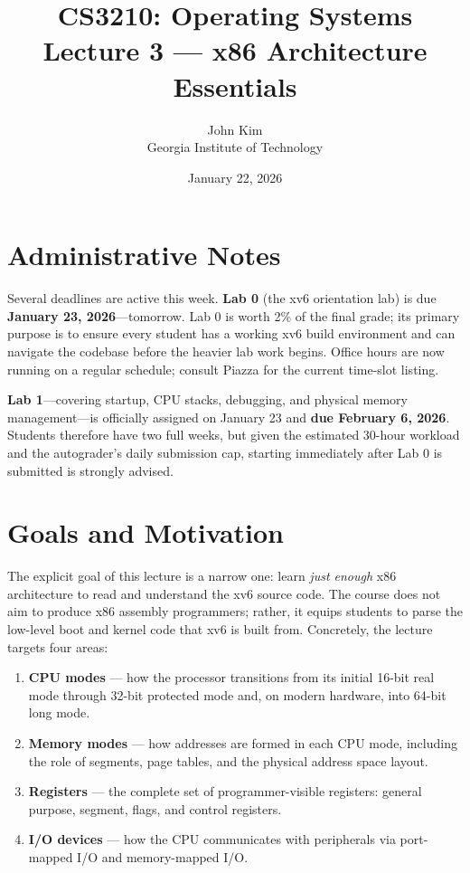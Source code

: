 \documentclass[11pt]{article}
\title{\textbf{CS3210: Operating Systems} \\ Lecture 3 --- x86 Architecture Essentials}
\author{John Kim \\ Georgia Institute of Technology}
\date{January 22, 2026}
\begin{document}
\maketitle
\tableofcontents
\newpage

\section{Administrative Notes}

Several deadlines are active this week. \textbf{Lab 0} (the xv6 orientation lab) is due
\textbf{January 23, 2026}---tomorrow. Lab 0 is worth 2\% of the final grade; its primary
purpose is to ensure every student has a working xv6 build environment and can navigate the
codebase before the heavier lab work begins. Office hours are now running on a regular schedule;
consult Piazza for the current time-slot listing.

\textbf{Lab 1}---covering startup, CPU stacks, debugging, and physical memory management---is
officially assigned on January 23 and \textbf{due February 6, 2026}. Students therefore have
two full weeks, but given the estimated 30-hour workload and the autograder's daily submission
cap, starting immediately after Lab 0 is submitted is strongly advised.

\section{Goals and Motivation}

The explicit goal of this lecture is a narrow one: learn \emph{just enough} x86 architecture
to read and understand the xv6 source code. The course does not aim to produce x86 assembly
programmers; rather, it equips students to parse the low-level boot and kernel code that xv6
is built from. Concretely, the lecture targets four areas:

\begin{enumerate}
    \item \textbf{CPU modes} --- how the processor transitions from its initial 16-bit real
          mode through 32-bit protected mode and, on modern hardware, into 64-bit long mode.
    \item \textbf{Memory modes} --- how addresses are formed in each CPU mode, including the
          role of segments, page tables, and the physical address space layout.
    \item \textbf{Registers} --- the complete set of programmer-visible registers: general
          purpose, segment, flags, and control registers.
    \item \textbf{I/O devices} --- how the CPU communicates with peripherals via port-mapped
          I/O and memory-mapped I/O.
\end{enumerate}
\end{document}
